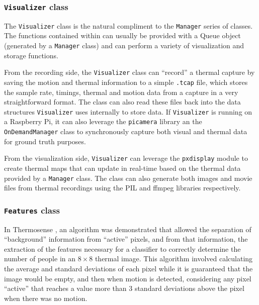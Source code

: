 \documentclass[../thesis/thesis.tex]{subfiles}
\begin{document}
\subsubsection{\texttt{Visualizer} class}
The \texttt{Visualizer} class is the natural compliment to the \texttt{Manager} series of classes. The functions contained within can usually be provided with a Queue object (generated by a \texttt{Manager} class) and can perform a variety of visualization and storage functions.

From the recording side, the \texttt{Visualizer} class can ``record'' a thermal capture by saving the motion and thermal information to a simple \texttt{.tcap} file, which stores the sample rate, timings, thermal and motion data from a capture in a very straightforward format. The class can also read these files back into the data structures \texttt{Visualizer} uses internally to store data. If \texttt{Visualizer} is running on a Raspberry Pi, it can also leverage the \texttt{picamera} library an the \texttt{OnDemandManager} class to synchronously capture both visual and thermal data for ground truth purposes.

From the visualization side, \texttt{Visualizer} can leverage the \texttt{pxdisplay} module to create thermal maps that can update in real-time based on the thermal data provided by a \texttt{Manager} class. The class can also generate both images and movie files from thermal recordings using the PIL and ffmpeg libraries respectively.

\subsubsection{\texttt{Features} class}

In Thermosense \cite{beltran2013thermosense}, an algorithm was demonstrated that allowed the separation of ``background'' information from ``active'' pixels, and from that information, the extraction of the features necessary for a classifier to correctly determine the number of people in an $8\times8$ thermal image. This algorithm involved calculating the average and standard deviations of each pixel while it is guaranteed that the image would be empty, and then when motion is detected, considering any pixel ``active'' that reaches a value more than 3 standard deviations above the pixel when there was no motion.
\end{document}

